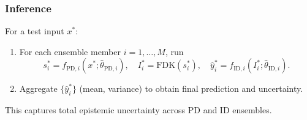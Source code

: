 \documentclass{article}
\newcommand{\0}{\varnothing}
\theoremstyle{definition}
\begin{document}
\subsubsection{Inference}
For a test input $x^\ast$:
\begin{enumerate}[1.]
  \item For each ensemble member $i=1,\dots,M$, run
    \[
      s_i^\ast = f_{\text{PD},i}(x^\ast;\hat\theta_{\text{PD},i}),\quad I_i^\ast = \mathrm{FDK}(s_i^\ast),\quad \hat y_i^\ast = f_{\text{ID},i}(I_i^\ast;\hat\theta_{\text{ID},i}).
    \]
  \item Aggregate $\{\hat y_i^\ast\}$ (mean, variance) to obtain final prediction and uncertainty.
\end{enumerate}
This captures total epistemic uncertainty across PD and ID ensembles.




\end{document}
